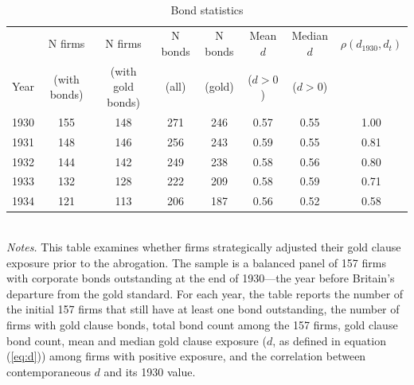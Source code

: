 \begin{table}[p]
    \centering
    \caption{\\ Bond statistics}
    \scriptsize
    \label{tab:bond_stats}
    
    \begin{threeparttable}
        \begin{tabular}{lccccccc}
            \toprule
                 & N firms & N firms & N bonds & N bonds & Mean $d$ & Median $d$ & $\rho(d_{1930}, d_t)$ \\
            Year & (with bonds) & (with gold bonds) & (all) & (gold) & ($d>0$) & ($d>0$) & \\
            \midrule
            1930 & 155 & 148 & 271 & 246 & 0.57 & 0.55 & 1.00 \\
            1931 & 148 & 146 & 256 & 243 & 0.59 & 0.55 & 0.81 \\
            1932 & 144 & 142 & 249 & 238 & 0.58 & 0.56 & 0.80 \\
            1933 & 132 & 128 & 222 & 209 & 0.58 & 0.59 & 0.71 \\
            1934 & 121 & 113 & 206 & 187 & 0.56 & 0.52 & 0.58 \\
            \bottomrule
        \end{tabular}
    \end{threeparttable}\\
    
    \vspace*{3mm} \justifying \noindent
    \scriptsize{\textit{Notes.} This table examines whether firms strategically adjusted their gold clause exposure prior to the abrogation. The sample is a balanced panel of 157 firms with corporate bonds outstanding at the end of 1930---the year before Britain's departure from the gold standard. For each year, the table reports the number of the initial 157 firms that still have at least one bond outstanding, the number of firms with gold clause bonds, total bond count among the 157 firms, gold clause bond count, mean and median gold clause exposure ($d$, as defined in equation (\ref{eq:d})) among firms with positive exposure, and the correlation between contemporaneous $d$ and its 1930 value.}
\end{table}